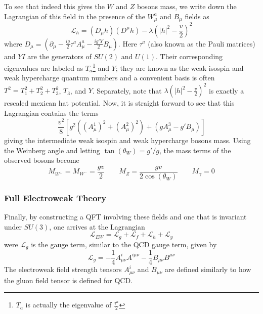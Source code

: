 To see that indeed this gives the $W$ and $Z$ bosons mass, we write down the Lagrangian of this field in the presence of the $W^a_\mu$ and $B_\mu$ fields as
\begin{equation}
\mathcal{L}_{h} = (D_{\mu}h)(D^\mu h) - \lambda\left(|h|^2- \frac{v}{2}\right)^2
\label{eq:higg-field-lagrangian}
\end{equation}
where $D_\mu = (\partial_\mu - \frac{ig}{2}\tau^a A^a_\mu - \frac{ig'Y}{2}B_\mu)$. Here $\tau^a$ (also known as the Pauli matrices) and $YI$ are the generators of $SU(2)$ and $U(1)$. Their corresponding eigenvalues are labeled as $T_a$\footnote{$T_a$ is actually the eigenvalue of $\frac{\tau^a}{2}$} and $Y$; they are known as the weak isospin and weak hypercharge quantum numbers and a convenient basis is often $T^2 = T_1^2 + T_2^2 + T_3^2$, $T_3$, and $Y$. Separately, note that $\lambda\left(|h|^2- \frac{v}{2}\right)^2$ is exactly a rescaled mexican hat potential. Now, it is straight forward to see that this Lagrangian contains the terms
\begin{equation}
\frac{v^2}{8}\left[g^2\left((A^{1}_{\mu})^2 + (A^{2}_{\mu})^2\right) + (gA_{\mu}^3 - g' B_{\mu})\right]
\end{equation}
giving the intermediate weak isospin and weak hypercharge bosons mass. Using the Weinberg angle and letting $\tan(\theta_W) = g'/g$, the mass terms of the observed bosons become
\begin{equation}
M_{W^+} = M_{W^-} = \frac{gv}{2} \quad\quad M_{Z} = \frac{gv}{2\cos(\theta_{W})} \quad\quad M_{\gamma} = 0
\end{equation}

\subsubsection{Full Electroweak Theory}

Finally, by constructing a QFT involving these fields and one that is invariant under $SU(3)$, one arrives at the Lagrangian
\begin{equation}
\mathcal{L}_{EW} = \mathcal{L}_{g} + \mathcal{L}_{f} + \mathcal{L}_{h} + \mathcal{L}_{y}
\end{equation}
were $\mathcal{L}_g$ is the gauge term, similar to the QCD gauge term, given by
\begin{equation}
\mathcal{L}_g = -\frac{1}{4}A^i_{\mu\nu}A^{i\mu\nu} - \frac{1}{4} B_{\mu\nu} B^{\mu\nu}
\end{equation}
The electroweak field strength tensors $A^i_{\mu\nu}$ and $B_{\mu\nu}$ are defined similarly to how the gluon field tensor is defined for QCD.


